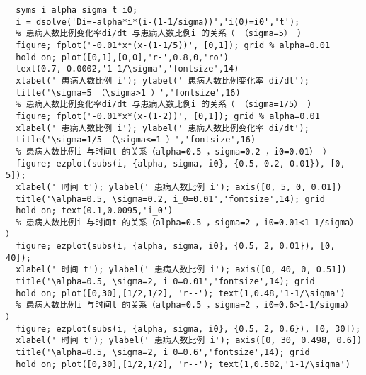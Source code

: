 \documentclass[oneside]{ctexart}
\begin{document}
\begin{lstlisting}
  syms i alpha sigma t i0;
  i = dsolve('Di=-alpha*i*(i-(1-1/sigma))','i(0)=i0','t');
  % 患病人数比例变化率di/dt 与患病人数比例i 的关系（ （sigma=5） ）
  figure; fplot('-0.01*x*(x-(1-1/5))', [0,1]); grid % alpha=0.01
  hold on; plot([0,1],[0,0],'r-',0.8,0,'ro')
  text(0.7,-0.0002,'1-1/\sigma','fontsize',14)
  xlabel(' 患病人数比例 i'); ylabel(' 患病人数比例变化率 di/dt');
  title('\sigma=5 （\sigma>1 ）','fontsize',16)
  % 患病人数比例变化率di/dt 与患病人数比例i 的关系（ （sigma=1/5） ）
  figure; fplot('-0.01*x*(x-(1-2))', [0,1]); grid % alpha=0.01
  xlabel(' 患病人数比例 i'); ylabel(' 患病人数比例变化率 di/dt');
  title('\sigma=1/5 （\sigma<=1 ）','fontsize',16)
  % 患病人数比例i 与时间t 的关系（alpha=0.5 ，sigma=0.2 ，i0=0.01） ）
  figure; ezplot(subs(i, {alpha, sigma, i0}, {0.5, 0.2, 0.01}), [0, 5]);
  xlabel(' 时间 t'); ylabel(' 患病人数比例 i'); axis([0, 5, 0, 0.01])
  title('\alpha=0.5, \sigma=0.2, i_0=0.01','fontsize',14); grid
  hold on; text(0.1,0.0095,'i_0')
  % 患病人数比例i 与时间t 的关系（alpha=0.5 ，sigma=2 ，i0=0.01<1-1/sigma） ）
  figure; ezplot(subs(i, {alpha, sigma, i0}, {0.5, 2, 0.01}), [0, 40]);
  xlabel(' 时间 t'); ylabel(' 患病人数比例 i'); axis([0, 40, 0, 0.51])
  title('\alpha=0.5, \sigma=2, i_0=0.01','fontsize',14); grid
  hold on; plot([0,30],[1/2,1/2], 'r--'); text(1,0.48,'1-1/\sigma')
  % 患病人数比例i 与时间t 的关系（alpha=0.5 ，sigma=2 ，i0=0.6>1-1/sigma） ）
  figure; ezplot(subs(i, {alpha, sigma, i0}, {0.5, 2, 0.6}), [0, 30]);
  xlabel(' 时间 t'); ylabel(' 患病人数比例 i'); axis([0, 30, 0.498, 0.6])
  title('\alpha=0.5, \sigma=2, i_0=0.6','fontsize',14); grid
  hold on; plot([0,30],[1/2,1/2], 'r--'); text(1,0.502,'1-1/\sigma') 
\end{lstlisting}
\end{document}
